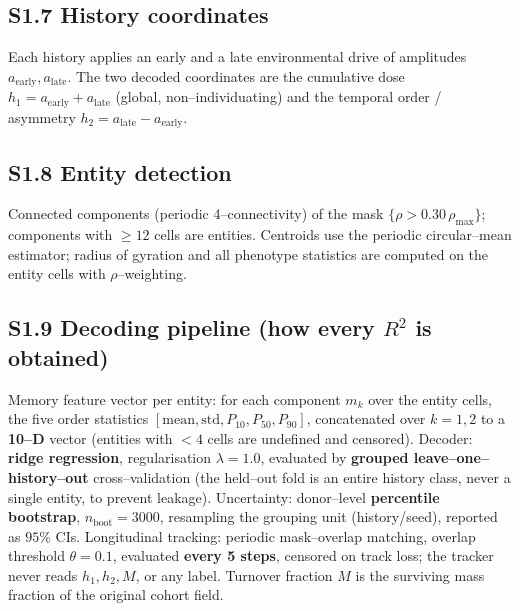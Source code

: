 \documentclass[11pt]{article}
\begin{document}
\subsection*{S1.7 History coordinates}
Each history applies an early and a late environmental drive of amplitudes $a_{\mathrm{early}},a_{\mathrm{late}}$.
The two decoded coordinates are the cumulative dose $h_1=a_{\mathrm{early}}+a_{\mathrm{late}}$ (global, non--individuating)
and the temporal order / asymmetry $h_2=a_{\mathrm{late}}-a_{\mathrm{early}}$.

\subsection*{S1.8 Entity detection}
Connected components (periodic 4--connectivity) of the mask $\{\rho>0.30\,\rho_{\max}\}$; components with
$\ge12$ cells are entities. Centroids use the periodic circular--mean estimator; radius of gyration and all
phenotype statistics are computed on the entity cells with $\rho$--weighting.

\subsection*{S1.9 Decoding pipeline (how every $R^2$ is obtained)}
Memory feature vector per entity: for each component $m_k$ over the entity cells, the five order statistics
$[\text{mean},\text{std},P_{10},P_{50},P_{90}]$, concatenated over $k=1,2$ to a \textbf{10--D} vector
(entities with $<4$ cells are undefined and censored). Decoder: \textbf{ridge regression},
regularisation $\lambda=1.0$, evaluated by \textbf{grouped leave--one--history--out} cross--validation (the
held--out fold is an entire history class, never a single entity, to prevent leakage). Uncertainty:
donor--level \textbf{percentile bootstrap}, $n_{\mathrm{boot}}=3000$, resampling the grouping unit (history/seed),
reported as $95\%$ CIs. Longitudinal tracking: periodic mask--overlap matching, overlap threshold
$\theta=0.1$, evaluated \textbf{every 5 steps}, censored on track loss; the tracker never reads
$h_1,h_2,M$, or any label. Turnover fraction $M$ is the surviving mass fraction of the original cohort field.
\end{document}
